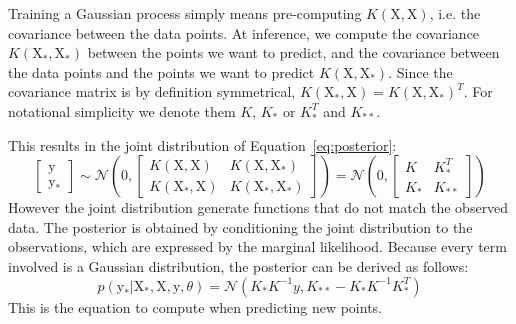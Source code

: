 Training a Gaussian process simply means pre-computing $K(\mathrm{X}, \mathrm{X})$, i.e. the covariance between the data points. At inference, we compute the covariance $K(\mathrm{X_*}, \mathrm{X_*})$ between the points we want to predict, and the covariance between the data points and the points we want to predict $K(\mathrm{X}, \mathrm{X_*})$. Since the covariance matrix is by definition symmetrical, $K(\mathrm{X_*}, \mathrm{X}) = K(\mathrm{X}, \mathrm{X_*})^T$. For notational simplicity we denote them $K$, $K_*$ or $K_*^T$ and $K_{**}$.

This results in the joint distribution of Equation~\ref{eq:posterior}:
\begin{equation}
    \begin{bmatrix}
    \mathrm{y} \\
    \mathrm{y_*}
    \end{bmatrix}
    \sim
    \mathcal{N} \left( 0, 
    \begin{bmatrix}
    K(\mathrm{X}, \mathrm{X}) & K(\mathrm{X}, \mathrm{X_*}) \\
    K(\mathrm{X_*}, \mathrm{X}) & K(\mathrm{X_*}, \mathrm{X_*})
    \end{bmatrix}
    \right)
    =
    \mathcal{N} \left( 0, 
    \begin{bmatrix}
    K & K_*^T \\
    K_* & K_{**}
    \end{bmatrix}
    \right)
\end{equation}
However the joint distribution generate functions that do not match the observed data. The posterior is obtained by conditioning the joint distribution to the observations, which are expressed by the marginal likelihood. Because every term involved is a Gaussian distribution, the posterior can be derived as follows:
\begin{equation}
    p\left( \mathrm{y_*} | \mathrm{X_*}, \mathrm{X}, \mathrm{y}, \theta \right)
    =
    \mathcal{N} \left( K_* K^{-1} y, 
    K_{**} - K_* K^{-1} K_*^T \right)
\end{equation}
This is the equation to compute when predicting new points. 

